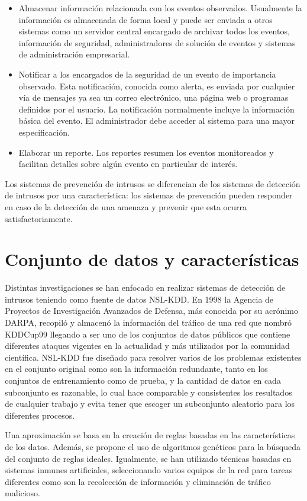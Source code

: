 \begin{itemize}
    \item Almacenar información relacionada con los eventos observados. Usualmente la información es almacenada de forma local y puede ser enviada a otros sistemas como un servidor central encargado de archivar todos los eventos, información de seguridad, administradores de solución de eventos y sistemas de administración empresarial.
    \item Notificar a los encargados de la seguridad de un evento de importancia observado. Esta notificación, conocida como alerta, es enviada por cualquier vía de mensajes ya sea un correo electrónico, una página web o programas definidos por el usuario. La notificación normalmente incluye la información básica del evento. El administrador debe acceder al sistema para una mayor especificación.
    \item Elaborar un reporte. Los reportes resumen los eventos monitoreados y facilitan detalles sobre algún evento en particular de interés.
\end{itemize}

Los sistemas de prevención de intrusos se diferencian de los sistemas de detección de intrusos por una característica: los sistemas de prevención pueden responder en caso de la detección de una amenaza y prevenir que esta ocurra satisfactoriamente.

\section{Conjunto de datos y características}
Distintas investigaciones se han enfocado en realizar sistemas de detección de intrusos teniendo como fuente de datos NSL-KDD. En 1998 la Agencia de Proyectos de Investigación Avanzados de Defensa, más conocida por su acrónimo DARPA, recopiló y almacenó la información del tráfico de una red que nombró KDDCup99 llegando a ser uno de los conjuntos de datos públicos que contiene diferentes ataques vigentes en la actualidad y más utilizados por la comunidad científica. NSL-KDD fue diseñado para resolver varios de los problemas existentes en el conjunto original como son la información redundante, tanto en los conjuntos de entrenamiento como de prueba, y la cantidad de datos en cada subconjunto es razonable, lo cual hace comparable y consistentes los resultados de cualquier trabajo y evita tener que escoger un subconjunto aleatorio para los diferentes procesos.

Una aproximación se basa en la creación de reglas basadas en las características de los datos. Además, se propone el uso de algoritmos genéticos para la búsqueda del conjunto de reglas ideales. Igualmente, se han utilizado técnicas basadas en sistemas inmunes artificiales, seleccionando varios equipos de la red para tareas diferentes como son la recolección de información y eliminación de tráfico malicioso.

